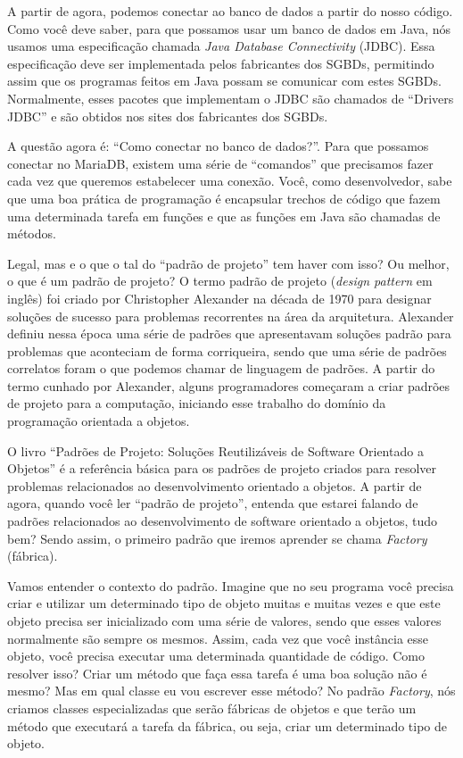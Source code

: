 A partir de agora, podemos conectar ao banco de dados a partir do nosso código. Como você deve saber, para que possamos usar um banco de dados em Java, nós usamos uma especificação chamada \textit{Java Database Connectivity} (JDBC). Essa especificação deve ser implementada pelos fabricantes dos SGBDs, permitindo assim que os programas feitos em Java possam se comunicar com estes SGBDs. Normalmente, esses pacotes que implementam o JDBC são chamados de ``Drivers JDBC'' e são obtidos nos sites dos fabricantes dos SGBDs.

A questão agora é: ``Como conectar no banco de dados?''. Para que possamos conectar no MariaDB, existem uma série de ``comandos'' que precisamos fazer cada vez que queremos estabelecer uma conexão. Você, como desenvolvedor, sabe que uma boa prática de programação é encapsular trechos de código que fazem uma determinada tarefa em funções e que as funções em Java são chamadas de métodos.

Legal, mas e o que o tal do ``padrão de projeto'' tem haver com isso? Ou melhor, o que é um padrão de projeto? O termo padrão de projeto (\textit{design pattern} em inglês) foi criado por Christopher Alexander \cite{Alexander1977} na década de 1970 para designar soluções de sucesso para problemas recorrentes na área da arquitetura. Alexander definiu nessa época uma série de padrões que apresentavam soluções padrão para problemas que aconteciam de forma corriqueira, sendo que uma série de padrões correlatos foram o que podemos chamar de linguagem de padrões. A partir do termo cunhado por Alexander, alguns programadores começaram a criar padrões de projeto para a computação, iniciando esse trabalho do domínio da programação orientada a objetos.

O livro ``Padrões de Projeto: Soluções Reutilizáveis de Software Orientado a Objetos'' \cite{Gamma2000} é a referência básica para os padrões de projeto criados para resolver problemas relacionados ao desenvolvimento orientado a objetos. A partir de agora, quando você ler ``padrão de projeto'', entenda que estarei falando de padrões relacionados ao desenvolvimento de software orientado a objetos, tudo bem? Sendo assim, o primeiro padrão que iremos aprender se chama \textit{Factory} (fábrica). 

Vamos entender o contexto do padrão. Imagine que no seu programa você precisa criar e utilizar um determinado tipo de objeto muitas e muitas vezes e que este objeto precisa ser inicializado com uma série de valores, sendo que esses valores normalmente são sempre os mesmos. Assim, cada vez que você instância esse objeto, você precisa executar uma determinada quantidade de código. Como resolver isso? Criar um método que faça essa tarefa é uma boa solução não é mesmo? Mas em qual classe eu vou escrever esse método? No padrão \textit{Factory}, nós criamos classes especializadas que serão fábricas de objetos e que terão um método que executará a tarefa da fábrica, ou seja, criar um determinado tipo de objeto.

